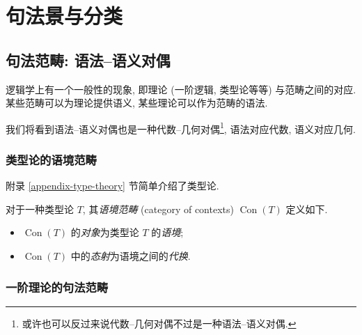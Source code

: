 \chapter{句法景与分类\topos{}}

\label{cla}

\section{句法范畴: 语法--语义对偶}





逻辑学上有一个一般性的现象, 即理论 (一阶逻辑, 类型论等等) 与范畴之间的对应. 某些范畴可以为理论提供语义, 某些理论可以作为范畴的语法.
%
\todo{}

我们将看到语法--语义对偶也是一种代数--几何对偶\footnote{或许也可以反过来说代数--几何对偶不过是一种语法--语义对偶.}, 语法对应代数, 语义对应几何.

\subsection{类型论的语境范畴}

附录 \ref{appendix-type-theory} 节简单介绍了类型论.

\begin{definition}
	{}
	对于一种类型论 $T$, 其\emph{语境范畴} (category of contexts) $\operatorname{Con}(T)$ 定义如下.
	\begin{itemize}
		\item $\operatorname{Con}(T)$ 的\emph{对象}为类型论 $T$ 的\emph{语境};
		\item $\operatorname{Con}(T)$ 中的\emph{态射}为语境之间的\emph{代换}.
	\end{itemize}
\end{definition}



\subsection{一阶理论的句法范畴}

